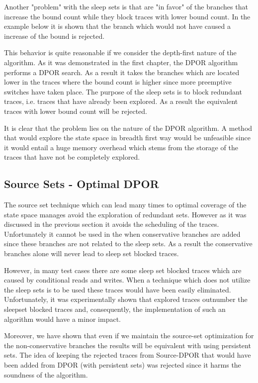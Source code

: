 Another "problem" with the sleep sets is that are "in favor" of the branches that increase the bound count while they
block traces with lower bound count. In the example below it is shown that the branch which would not have caused a
increase of the bound is rejected.


This behavior is quite reasonable if we consider the depth-first nature of the algorithm. As it was demonstrated in the
first chapter, the DPOR algorithm performs a DPOR search. As a result it takes the branches which are located lower in
the traces where the bound count is higher since more preemptive switches have taken place. The purpose of the sleep
sets is to block redundant traces, i.e. traces that have already been explored. As a result the equivalent traces with
lower bound count will be rejected.

It is clear that the problem lies on the nature of the DPOR algorithm. A method that would explore the state space in
breadth first way would be unfeasible since it would entail a huge memory overhead which stems from the storage of the
traces that have not be completely explored. 

\subsection{Source Sets - Optimal DPOR}
The source set technique which can lead many times to optimal coverage of the state space manages avoid the exploration
of redundant sets. However as it was discussed in the previous section it avoids the scheduling of the traces.
Unfortunately it cannot be used in the when conservative branches are added since these branches are not related to the
sleep sets. As a result the conservative branches alone will never lead to sleep set blocked traces.

However, in many test cases there are some sleep set blocked traces which are caused by conditional reads and writes.
When a technique which does not utilize the sleep sets is to be used these traces would have been easily eliminated.
Unfortunately, it was experimentally shown that explored traces outnumber the sleepset blocked traces and, consequently,
the implementation of such an algorithm would have a minor impact.

Moreover, we have shown that even if we maintain the source-set optimization for the non-conservative branches the
results will be equivalent with using persistent sets. The idea of keeping the rejected traces from Source-DPOR that
would have been added from DPOR (with persistent sets) was rejected since it harms the soundness of the algorithm.

